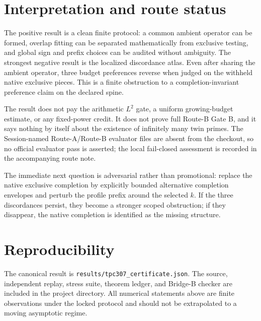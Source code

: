 \documentclass[11pt]{article}
\begin{document}
\section{Interpretation and route status}

The positive result is a clean finite protocol: a common ambient operator can
be formed, overlap fitting can be separated mathematically from exclusive
testing, and global sign and prefix choices can be audited without ambiguity.
The strongest negative result is the localized discordance atlas.  Even after
sharing the ambient operator, three budget preferences reverse when judged on
the withheld native exclusive pieces.  This is a finite obstruction to a
completion-invariant preference claim on the declared spine.

The result does not pay the arithmetic $L^2$ gate, a uniform growing-budget
estimate, or any fixed-power credit.  It does not prove full Route-B Gate B,
and it says nothing by itself about the existence of infinitely many twin
primes.  The Session-named Route-A/Route-B evaluator files are absent from the
checkout, so no official evaluator pass is asserted; the local fail-closed
assessment is recorded in the accompanying route note.

The immediate next question is adversarial rather than promotional: replace
the native exclusive completion by explicitly bounded alternative completion
envelopes and perturb the profile prefix around the selected $k$.  If the
three discordances persist, they become a stronger scoped obstruction; if they
disappear, the native completion is identified as the missing structure.

\section*{Reproducibility}

The canonical result is \texttt{results/tpc307\_certificate.json}.  The source,
independent replay, stress suite, theorem ledger, and Bridge-B checker are
included in the project directory.  All numerical statements above are
finite observations under the locked protocol and should not be extrapolated
to a moving asymptotic regime.



\end{document}
